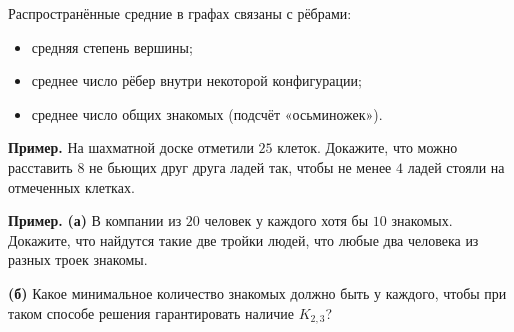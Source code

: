 Распространённые средние в графах связаны с рёбрами:
\begin{itemize}
    \item средняя степень вершины;
    \item среднее число рёбер внутри некоторой конфигурации;
    \item среднее число общих знакомых (подсчёт «осьминожек»).
\end{itemize}

\begin{tcolorbox}[
    enhanced,
    breakable,
    colback=gray!10,
    colframe=black!70,
    boxrule=0.6pt,
    arc=2mm
]
\textbf{Пример.}
На шахматной доске отметили $25$ клеток. Докажите, что можно расставить $8$ не бьющих друг друга ладей так, чтобы не менее $4$ ладей стояли на отмеченных клетках.
\end{tcolorbox}

\begin{tcolorbox}[
    enhanced,
    breakable,
    colback=gray!10,
    colframe=black!70,
    boxrule=0.6pt,
    arc=2mm
]

\newpage

\hspace{3mm}

\textbf{Пример.}
\textbf{(а)} В компании из $20$ человек у каждого хотя бы $10$ знакомых.
Докажите, что найдутся такие две тройки людей, что любые два человека из разных троек знакомы.

\textbf{(б)} Какое минимальное количество знакомых должно быть у каждого, чтобы при таком способе решения гарантировать наличие $K_{2,3}$?
\end{tcolorbox}

